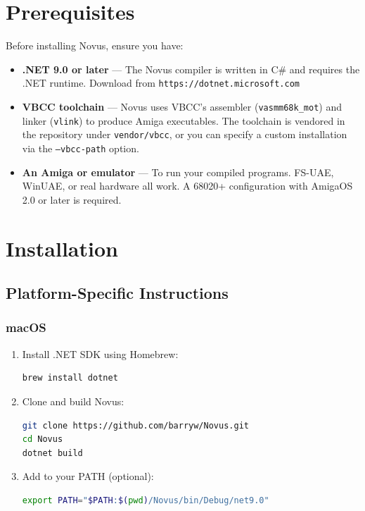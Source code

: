 \section{Prerequisites}
\label{sec:prerequisites}

Before installing Novus, ensure you have:

\begin{itemize}
    \item \textbf{.NET 9.0 or later} --- The Novus compiler is written in C\# and requires the .NET runtime. Download from \texttt{https://dotnet.microsoft.com}

    \item \textbf{VBCC toolchain} --- Novus uses VBCC's assembler (\texttt{vasmm68k\_mot}) and linker (\texttt{vlink}) to produce Amiga executables. The toolchain is vendored in the repository under \texttt{vendor/vbcc}, or you can specify a custom installation via the \texttt{--vbcc-path} option.

    \item \textbf{An Amiga or emulator} --- To run your compiled programs. FS-UAE, WinUAE, or real hardware all work. A 68020+ configuration with AmigaOS 2.0 or later is required.
\end{itemize}

\section{Installation}
\label{sec:installation}

\subsection{Platform-Specific Instructions}

\subsubsection{macOS}

\begin{enumerate}
\item Install .NET SDK using Homebrew:
\begin{lstlisting}[language=bash]
brew install dotnet
\end{lstlisting}

\item Clone and build Novus:
\begin{lstlisting}[language=bash]
git clone https://github.com/barryw/Novus.git
cd Novus
dotnet build
\end{lstlisting}

\item Add to your PATH (optional):
\begin{lstlisting}[language=bash]
export PATH="$PATH:$(pwd)/Novus/bin/Debug/net9.0"
\end{lstlisting}
\end{enumerate}

